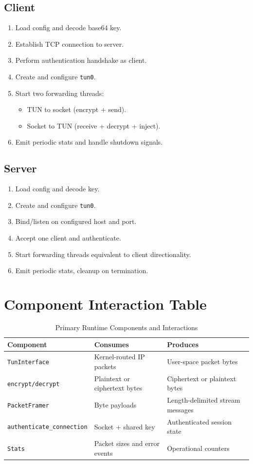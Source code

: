 \subsection{Client}
\begin{enumerate}[leftmargin=2em]
\item Load config and decode base64 key.
\item Establish TCP connection to server.
\item Perform authentication handshake as client.
\item Create and configure \texttt{tun0}.
\item Start two forwarding threads:
  \begin{itemize}[leftmargin=2em]
  \item TUN to socket (encrypt + send).
  \item Socket to TUN (receive + decrypt + inject).
  \end{itemize}
\item Emit periodic stats and handle shutdown signals.
\end{enumerate}

\subsection{Server}
\begin{enumerate}[leftmargin=2em]
\item Load config and decode key.
\item Create and configure \texttt{tun0}.
\item Bind/listen on configured host and port.
\item Accept one client and authenticate.
\item Start forwarding threads equivalent to client directionality.
\item Emit periodic stats, cleanup on termination.
\end{enumerate}

\section{Component Interaction Table}
\begin{table}[H]
\centering
\caption{Primary Runtime Components and Interactions}
\begin{tabular}{p{}p{}p{}}
\toprule
\textbf{Component} & \textbf{Consumes} & \textbf{Produces} \\
\midrule
\texttt{TunInterface} & Kernel-routed IP packets & User-space packet bytes \\
\texttt{encrypt/decrypt} & Plaintext or ciphertext bytes & Ciphertext or plaintext bytes \\
\texttt{PacketFramer} & Byte payloads & Length-delimited stream messages \\
\texttt{authenticate\_connection} & Socket + shared key & Authenticated session state \\
\texttt{Stats} & Packet sizes and error events & Operational counters \\
\bottomrule
\end{tabular}
\end{table}

